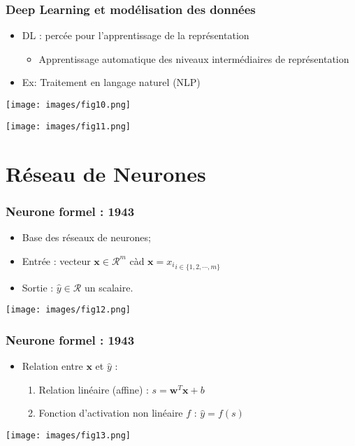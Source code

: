 \documentclass[9pt]{beamer}
\newcommand \ve[1]{\mathbf{#1}}
\begin{document}
\begin{frame}
\frametitle{Deep Learning et modélisation des données}

\begin{itemize}
\item DL :  percée pour l'apprentissage de la représentation
\begin{itemize}
\item Apprentissage automatique des niveaux intermédiaires de représentation
\end{itemize}
\end{itemize}

\begin{minipage}[c]{0.5\linewidth}
\begin{itemize}
\item Ex: Traitement en langage naturel (NLP)
\end{itemize}
\texttt{[image: images/fig10.png]}
\end{minipage} \hfill
\begin{minipage}[c]{0.25\linewidth}
\texttt{[image: images/fig11.png]}
\end{minipage}
\end{frame}

\section{Réseau de Neurones}
\begin{frame}
\frametitle{Neurone formel : 1943}
\begin{itemize}
\item Base des réseaux de neurones;
\item Entrée : vecteur $\ve{x}\in\mathcal{R}^m$ càd $\ve{x}={x_i}_{i\in \{1,2,\cdots ,m\}}$
\item Sortie : $\hat{y}\in \mathcal{R}$ un scalaire.
\end{itemize}
\begin{center}
\texttt{[image: images/fig12.png]}
\end{center}
\end{frame}


\begin{frame}
\frametitle{Neurone formel : 1943}
\begin{itemize}
\item Relation entre $\ve{x}$ et $\hat{y}$ :
\begin{enumerate}
\item Relation linéaire (affine) : $s=\ve{w}^T\ve{x}+b$
\item Fonction d'activation non linéaire $f$ : $\hat{y}=f(s)$
\end{enumerate}
\end{itemize}
\begin{center}
\texttt{[image: images/fig13.png]}
\end{center}
\end{frame}
\end{document}
